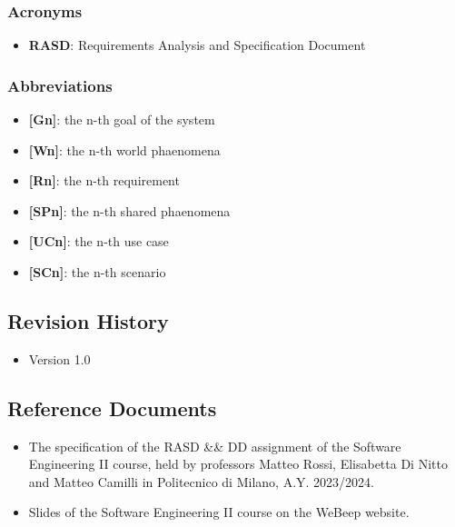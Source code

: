 \documentclass{article}
\begin{document}
\subsubsection{Acronyms}
\begin{itemize}
\item \textbf{RASD}: Requirements Analysis and Specification Document
\end{itemize}
\subsubsection{Abbreviations}
\begin{itemize}
\item \textbf{[Gn]}: the n-th goal of the system
\item \textbf{[Wn]}: the n-th world phaenomena
\item \textbf{[Rn]}: the n-th requirement
\item \textbf{[SPn]}: the n-th shared phaenomena
\item \textbf{[UCn]}: the n-th use case
\item \textbf{[SCn]}: the n-th scenario
\end{itemize}
\subsection{Revision History}
\begin{itemize}
\item Version 1.0
\end{itemize}
\subsection{Reference Documents}
\begin{itemize}
\item The specification of the RASD \&\& DD assignment of the Software Engineering II course, held by professors Matteo Rossi, Elisabetta Di Nitto and Matteo Camilli in Politecnico di Milano, A.Y. 2023/2024.
\item Slides of the Software Engineering II course on the WeBeep website.
\end{itemize}
\end{document}
